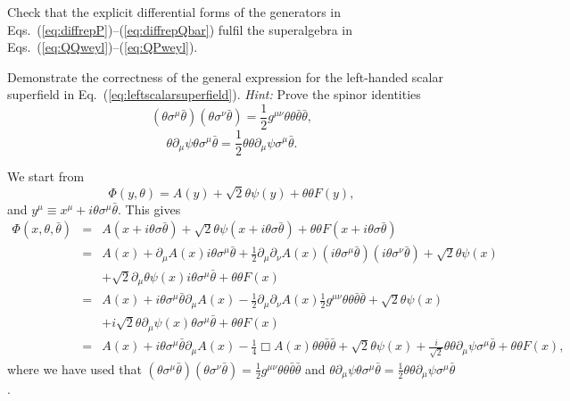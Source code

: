 \documentclass[notes.tex]{subfiles}
\begin{document}
\begin{Exercise}
Check that the explicit differential forms of the generators in Eqs.~(\ref{eq:diffrepP})--(\ref{eq:diffrepQbar}) fulfil the superalgebra in Eqs.~(\ref{eq:QQweyl})--(\ref{eq:QPweyl}).
\end{Exercise}

\begin{Exercise}
Demonstrate the correctness of the general expression for the left-handed scalar superfield in Eq.~(\ref{eq:leftscalarsuperfield}). {\it Hint:} Prove the spinor identities
\[ (\theta\sigma^\mu \bar{\theta})(\theta\sigma^\nu \bar{\theta})=\frac{1}{2}g^{\mu\nu}\theta\theta\bar\theta\bar\theta, \]
\[ \theta\partial_\mu\psi\theta\sigma^\mu \bar{\theta}=\frac{1}{2}\theta\theta\partial_\mu \psi\sigma^\mu\bar{\theta}. \]
\end{Exercise}

\begin{Answer}
We start from
\begin{equation*}
\Phi(y, \theta) = A(y) + \sqrt{2}\theta\psi(y) + \theta\theta F(y),
\end{equation*}
and $y^\mu \equiv x^\mu + i\theta\sigma^\mu \bar{\theta}$. This gives
\begin{eqnarray*}
\Phi(x, \theta, \bar\theta) &=& A(x + i\theta\sigma\bar{\theta}) + \sqrt{2}\theta\psi(x + i\theta\sigma\bar{\theta}) + \theta\theta F(x + i\theta\sigma \bar{\theta}) \\
&=& A(x) + \partial_\mu A(x)i\theta\sigma^\mu \bar{\theta} + \frac{1}{2}\partial_\mu\partial_\nu A(x)(i\theta\sigma^\mu \bar{\theta})(i\theta\sigma^\nu \bar{\theta})+ \sqrt{2}\theta\psi(x) \\
&&+ \sqrt{2}\partial_\mu\theta\psi(x)i\theta\sigma^\mu \bar{\theta} + \theta\theta F(x) \\
&=& A(x) + i\theta\sigma^\mu \bar{\theta}\partial_\mu A(x) - \frac{1}{2}\partial_\mu\partial_\nu A(x)\frac{1}{2}g^{\mu\nu}\theta\theta\bar\theta\bar\theta+ \sqrt{2}\theta\psi(x) \\
&& + i\sqrt{2}\theta\partial_\mu\psi(x)\theta\sigma^\mu \bar{\theta} + \theta\theta F(x) \\
&=& A(x) + i\theta\sigma^\mu \bar{\theta}\partial_\mu A(x) - \frac{1}{4} \Box A(x)\theta\theta\bar\theta\bar\theta+ \sqrt{2}\theta\psi(x)+\frac{i}{\sqrt{2}}\theta\theta\partial_\mu \psi\sigma^\mu\bar{\theta} + \theta\theta F(x),
\end{eqnarray*}
where we have used that $(\theta\sigma^\mu \bar{\theta})(\theta\sigma^\nu \bar{\theta})=\frac{1}{2}g^{\mu\nu}\theta\theta\bar\theta\bar\theta$ and 
$\theta\partial_\mu\psi\theta\sigma^\mu \bar{\theta}=\frac{1}{2}\theta\theta\partial_\mu \psi\sigma^\mu\bar{\theta}$.
\end{Answer}
\end{document}

